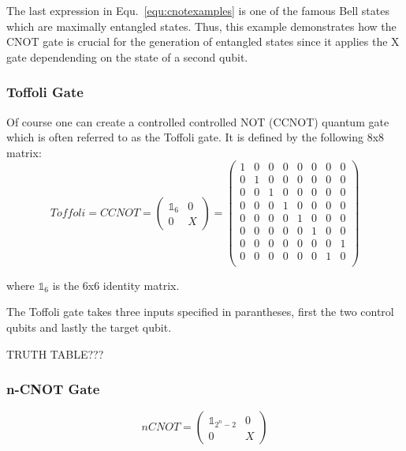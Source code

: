 The last expression in Equ.~\ref{equ:cnotexamples} is one of the famous Bell states which are maximally entangled states. Thus, this example demonstrates how the CNOT gate is crucial for the generation of entangled states since it applies the X gate dependending on the state of a second qubit.

\subsubsection{Toffoli Gate}
\label{subsubsubsec:toffoligate}

Of course one can create a controlled controlled NOT (CCNOT) quantum gate which is often referred to as the Toffoli gate. It is defined by the following 8x8 matrix:
\begin{equation}
Toffoli = CCNOT = \begin{pmatrix}
 \mathbb{1}_6 & 0 \\ 
 0 & X
 \end{pmatrix} = \begin{pmatrix}
 1 & 0 & 0 & 0 & 0 & 0 & 0 & 0 \\ 
 0 & 1 & 0 & 0 & 0 & 0 & 0 & 0 \\ 
 0 & 0 & 1 & 0 & 0 & 0 & 0 & 0 \\ 
 0 & 0 & 0 & 1 & 0 & 0 & 0 & 0 \\ 
 0 & 0 & 0 & 0 & 1 & 0 & 0 & 0 \\ 
 0 & 0 & 0 & 0 & 0 & 1 & 0 & 0 \\
 0 & 0 & 0 & 0 & 0 & 0 & 0 & 1 \\ 
 0 & 0 & 0 & 0 & 0 & 0 & 1 & 0 \\ 
 \end{pmatrix}
\end{equation}

where $\mathbb{1}_6$ is the 6x6 identity matrix.

The Toffoli gate takes three inputs specified in parantheses, first the two control qubits and lastly the target qubit.

TRUTH TABLE???

\subsubsection{n-CNOT Gate}
\label{subsubsubsec:ncnotgate}
\begin{equation}
nCNOT = \begin{pmatrix}
 \mathbb{1}_{2^n-2} & 0 \\ 
 0 & X
 \end{pmatrix}
\end{equation}

